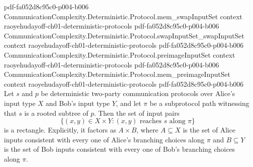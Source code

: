 \begin{theorem}
  {pdf-fa052d8c95c0-p004-b006}
\proofstep
  {CommunicationComplexity.Deterministic.Protocol.mem_swapInputSet}
  {context}
  {raoyehudayoff-ch01-deterministic-protocols}
  {pdf-fa052d8c95c0-p004-b006}
\proofstep
  {CommunicationComplexity.Deterministic.Protocol.swapInputSet_swapInputSet}
  {context}
  {raoyehudayoff-ch01-deterministic-protocols}
  {pdf-fa052d8c95c0-p004-b006}
\proofstep
  {CommunicationComplexity.Deterministic.Protocol.preimageInputSet}
  {context}
  {raoyehudayoff-ch01-deterministic-protocols}
  {pdf-fa052d8c95c0-p004-b006}
\proofstep
  {CommunicationComplexity.Deterministic.Protocol.mem_preimageInputSet}
  {context}
  {raoyehudayoff-ch01-deterministic-protocols}
  {pdf-fa052d8c95c0-p004-b006}
Let $s$ and $p$ be deterministic two-party communication protocols over Alice's input
type $X$ and Bob's input type $Y$, and let $\pi$ be a subprotocol path witnessing that
$s$ is a rooted subtree of $p$. Then the set of input pairs
\[
\{(x, y) \in X \times Y : (x,y) \text{ reaches } s \text{ along } \pi\}
\]
is a rectangle. Explicitly, it factors as $A \times B$, where $A \subseteq X$ is the set
of Alice inputs consistent with every one of Alice's branching choices along $\pi$ and
$B \subseteq Y$ is the set of Bob inputs consistent with every one of Bob's branching
choices along $\pi$.
\end{theorem}


